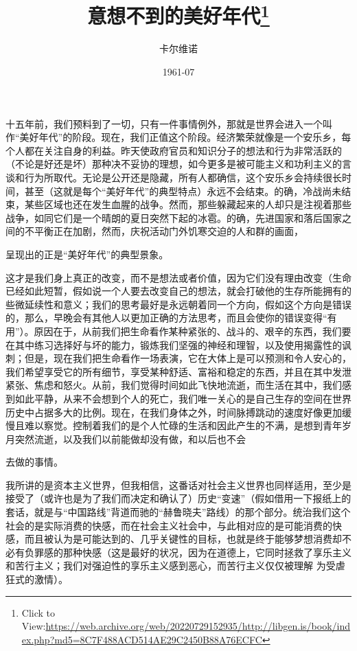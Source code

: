 \documentclass{article}
\title{意想不到的美好年代\footnote{Click to View:\url{https://web.archive.org/web/20220729152935/http://libgen.is/book/index.php?md5=8C7F488ACD514AE29C2450B88A76ECFC}}}
\author{卡尔维诺}
\date{1961-07}
\begin{document}

\maketitle


\Large

﻿十五年前，我们预料到了一切，只有一件事情例外，那就是世界会进入一个叫作“美好年代”的阶段。现在，我们正值这个阶段。经济繁荣就像是一个安乐乡，每个人都在关注自身的利益。昨天使政府官员和知识分子的想法和行为非常活跃的（不论是好还是坏）那种决不妥协的理想，如今更多是被可能主义和功利主义的言谈和行为所取代。无论是公开还是隐藏，所有人都确信，这个安乐乡会持续很长时间，甚至（这就是每个“美好年代”的典型特点）永远不会结束。的确，冷战尚未结束，某些区域也还在发生血腥的战争。然而，那些躲藏起来的人却只是注视着那些战争，如同它们是一个晴朗的夏日突然下起的冰雹。的确，先进国家和落后国家之间的不平衡正在加剧，然而，庆祝活动门外饥寒交迫的人和群的画面，

\newpage
呈现出的正是“美好年代”的典型景象。 

这才是我们身上真正的改变，而不是想法或者价值，因为它们没有理由改变（生命已经如此短暂，假如说一个人要去改变自己的想法，就会打破他的生存所能拥有的些微延续性和意义；我们的思考最好是永远朝着同一个方向，假如这个方向是错误的，那么，早晚会有其他人以更加正确的方法思考，而且会使你的错误变得“有用”）。原因在于，从前我们把生命看作某种紧张的、战斗的、艰辛的东西，我们要在其中练习选择好与坏的能力，锻炼我们坚强的神经和理智，以及使用揭露性的讽刺；但是，现在我们把生命看作一场表演，它在大体上是可以预测和令人安心的，我们希望享受它的所有细节，享受某种舒适、富裕和稳定的东西，并且在其中发泄紧张、焦虑和怒火。从前，我们觉得时间如此飞快地流逝，而生活在其中，我们感到如此平静，从来不会想到个人的死亡，我们唯一关心的是自己生存的空间在世界历史中占据多大的比例。现在，在我们身体之外，时间脉搏跳动的速度好像更加缓慢且难以察觉。控制着我们的是个人忙碌的生活和因此产生的不满，是想到青年岁月突然流逝，以及我们以前能做却没有做，和以后也不会
\newpage

去做的事情。 

我所讲的是资本主义世界，但我相信，这番话对社会主义世界也同样适用，至少是接受了（或许也是为了我们而决定和确认了）历史“变速”（假如借用一下报纸上的套话，就是与“中国路线”背道而驰的“赫鲁晓夫”路线）的那个部分。统治我们这个社会的是实际消费的快感，而在社会主义社会中，与此相对应的是可能消费的快感，而且被认为是可能达到的、几乎关键性的目标，也就是终于能够梦想消费却不必有负罪感的那种快感（这是最好的状况，因为在道德上，它同时拯救了享乐主义和苦行主义；我们对强迫性的享乐主义感到恶心，而苦行主义仅仅被理解
为受虐狂式的激情）。 
\end{document}
